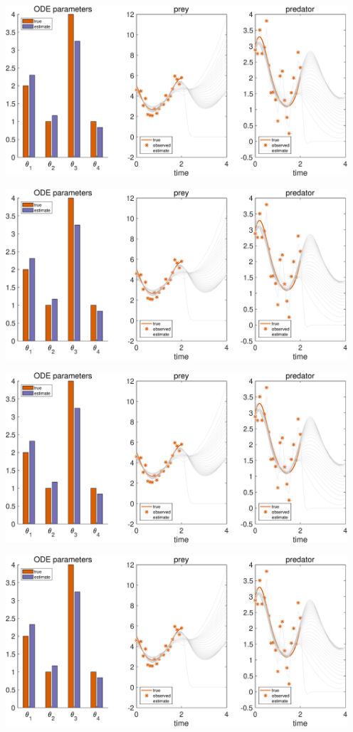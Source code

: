 {\includegraphics [width=5in]{Lotka_Volterra_3_33.eps}

\includegraphics [width=5in]{Lotka_Volterra_3_34.eps}

\includegraphics [width=5in]{Lotka_Volterra_3_35.eps}

\includegraphics [width=5in]{Lotka_Volterra_3_36.eps}

}
